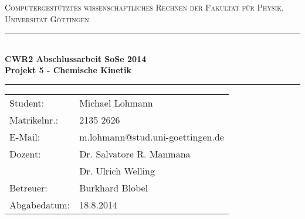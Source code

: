 \documentclass[12pt,a4paper,titlepage,headinclude,bibtotoc]{scrartcl}
\begin{document}
\begin{titlepage}
\centering
\textsc{\Large Computergestütztes wissenschaftliches Rechnen der Fakultät für
  Physik,\\[1.5ex] Universität Göttingen}

\vspace*{3cm}

\rule{\textwidth}{1pt}\\[0.5cm]
{\huge \bfseries
  CWR2 Abschlussarbeit SoSe 2014\\[1.5ex]
  Projekt 5 - Chemische Kinetik}\\[0.5cm]
\rule{\textwidth}{1pt}

\vspace*{3cm}

\begin{Large}
\begin{tabular}{ll}
Student: &  Michael Lohmann\\
Matrikelnr.: & 2135 2626\\
E-Mail: & m.lohmann@stud.uni-goettingen.de\\
Dozent: & Dr. Salvatore R. Manmana\\
 & Dr. Ulrich Welling\\
Betreuer: & Burkhard Blobel \\
Abgabedatum: & 18.8.2014\\
\end{tabular}
\end{Large}

\vspace*{0.8cm}

\begin{Large}
\end{Large}

\end{titlepage}

\tableofcontents

\newpage
\end{document}
